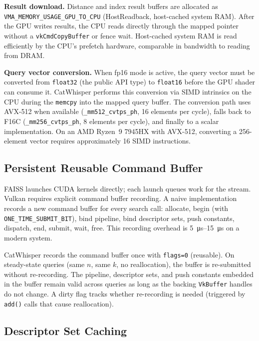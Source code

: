 \documentclass[conference]{IEEEtran}
\begin{document}
\textbf{Result download.}  Distance and index result buffers are allocated
as \texttt{VMA\_MEMORY\_USAGE\_GPU\_TO\_CPU} (HostReadback, host-cached
system RAM).  After the GPU writes results, the CPU reads directly through
the mapped pointer without a \texttt{vkCmdCopyBuffer} or fence wait.
Host-cached system RAM is read efficiently by the CPU's prefetch hardware,
comparable in bandwidth to reading from DRAM.

\textbf{Query vector conversion.}  When fp16 mode is active, the query
vector must be converted from \texttt{float32} (the public API type) to
\texttt{float16} before the GPU shader can consume it.  CatWhisper performs
this conversion via SIMD intrinsics on the CPU during the \texttt{memcpy}
into the mapped query buffer.  The conversion path uses AVX-512 when
available (\texttt{\_mm512\_cvtps\_ph}, 16 elements per cycle), falls back
to F16C (\texttt{\_mm256\_cvtps\_ph}, 8 elements per cycle), and finally
to a scalar implementation.  On an AMD Ryzen~9 7945HX with AVX-512,
converting a 256-element vector requires approximately 16 SIMD instructions.

\subsection{Persistent Reusable Command Buffer}

FAISS launches CUDA kernels directly; each launch queues work for the stream.
Vulkan requires explicit command buffer recording.  A naive implementation
records a new command buffer for every search call: allocate, begin (with
\texttt{ONE\_TIME\_SUBMIT\_BIT}), bind pipeline, bind descriptor sets, push
constants, dispatch, end, submit, wait, free.  This recording overhead is
\SI{5}{\micro\second}--\SI{15}{\micro\second} on a modern system.

CatWhisper records the command buffer once with \texttt{flags=0}
(reusable).  On steady-state queries (same $n$, same $k$, no reallocation),
the buffer is re-submitted without re-recording.  The pipeline, descriptor
sets, and push constants embedded in the buffer remain valid across queries
as long as the backing \texttt{VkBuffer} handles do not change.  A dirty
flag tracks whether re-recording is needed (triggered by \texttt{add()} calls
that cause reallocation).

\subsection{Descriptor Set Caching}
\end{document}
